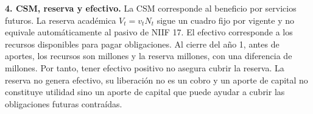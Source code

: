 \textbf{4. CSM, reserva y efectivo.}
La CSM corresponde al beneficio por servicios futuros. La reserva académica
$V_t=v_tN_t$ sigue un cuadro fijo por vigente y no equivale automáticamente
al pasivo de NIIF 17. El efectivo corresponde a los recursos disponibles
para pagar obligaciones. Al cierre del año 1, antes de aportes, los recursos
son \RecursosUnoF{} millones y la reserva \ReservaUnoF{} millones, con una
diferencia de \BrechaUnoF{} millones. Por tanto, tener efectivo positivo
no asegura cubrir la reserva. La reserva no genera efectivo, su liberación
no es un cobro y un aporte de capital no constituye utilidad sino un aporte de capital que puede ayudar 
a cubrir las obligaciones futuras contraídas.

